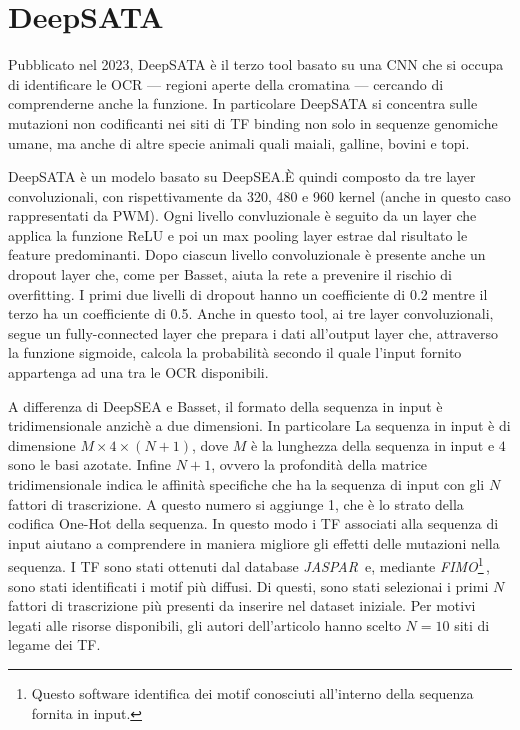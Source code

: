 \section{DeepSATA}\label{sec:DeepSATA}
% 
Pubblicato nel 2023, DeepSATA è il terzo tool basato su una \acs{CNN} che si occupa di identificare le \acs{OCR} — regioni aperte della cromatina — cercando di comprenderne anche la funzione. In particolare DeepSATA si concentra sulle mutazioni non codificanti nei siti di \acs{TF} binding non solo in sequenze genomiche umane, ma anche di altre specie animali quali maiali, galline, bovini e topi.

DeepSATA è un modelo basato su DeepSEA.\@ È quindi composto da tre layer convoluzionali, con rispettivamente da 320, 480 e 960 kernel (anche in questo caso rappresentati da \acs{PWM}). Ogni livello convluzionale è seguito da un layer che applica la funzione \acs{ReLU} e poi un max pooling layer estrae dal risultato le feature predominanti. Dopo ciascun livello convoluzionale è presente anche un dropout layer che, come per Basset, aiuta la rete a prevenire il rischio di overfitting. I primi due livelli di dropout hanno un coefficiente di 0.2 mentre il terzo ha un coefficiente di 0.5. Anche in questo tool, ai tre layer convoluzionali, segue un fully-connected layer che prepara i dati all'output layer che, attraverso la funzione sigmoide, calcola la probabilità secondo il quale l'input fornito appartenga ad una tra le \acs{OCR} disponibili.

A differenza di DeepSEA e Basset, il formato della sequenza in input è tridimensionale anzichè a due dimensioni. In particolare La sequenza in input è di dimensione $M \times 4 \times (N + 1)$, dove $M$ è la lunghezza della sequenza in input e $4$ sono le basi azotate. Infine $N + 1$, ovvero la profondità della matrice tridimensionale indica le affinità specifiche che ha la sequenza di input con gli $N$ fattori di trascrizione. A questo numero si aggiunge 1, che è lo strato della codifica One-Hot della sequenza. In questo modo i \acs{TF} associati alla sequenza di input aiutano a comprendere in maniera migliore gli effetti delle mutazioni nella sequenza. I \acs{TF} sono stati ottenuti dal database \textsl{JASPAR}\,\cite{jaspar} e, mediante \textsl{FIMO}\footnote{Questo software identifica dei motif conosciuti all'interno della sequenza fornita in input.}\,\cite{grant2011fimo}, sono stati identificati i motif più diffusi. Di questi, sono stati selezionai i primi $N$ fattori di trascrizione più presenti da inserire nel dataset iniziale. Per motivi legati alle risorse disponibili, gli autori dell'articolo hanno scelto $N=10$ siti di legame dei \acs{TF}. 

